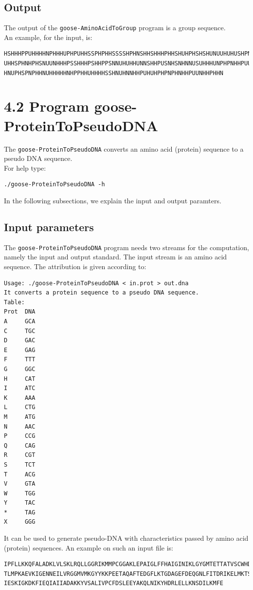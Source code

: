 \documentclass[11pt,journal,compsoc]{report}[1]
\begin{document}
\subsection*{Output}

The output of the \texttt{goose-AminoAcidToGroup} program is a group sequence.\\
An example, for the input, is:
\begin{lstlisting}
HSHHHPPUHHHHNPHHHUPHPUHHSSPHPHHSSSSHPHNSHHSHHHPHHSHUHPHSHSHUNUUHUHUSHPNHUHUSUUHS
UHHSPHNHPHSNUUNHHHPSSHHHPSHHPPSNNUHUHHUNNSHHPUSNHSNHNNUSUHHHUNPHPNHHPUUUSPHHHSUH
HNUPHSPNPHHNUHHHHHNHPPHHUHHHHSSHNUHNNHHPUHUHPHPNPHNHHPUUNHHPHHN
\end{lstlisting}

\section*{4.2 Program goose-ProteinToPseudoDNA}

The \texttt{goose-ProteinToPseudoDNA} converts an amino acid (protein) sequence to a pseudo DNA sequence.\\
For help type:
\begin{lstlisting}
./goose-ProteinToPseudoDNA -h
\end{lstlisting}
In the following subsections, we explain the input and output paramters.

\subsection*{Input parameters}

The \texttt{goose-ProteinToPseudoDNA} program needs two streams for the computation,
namely the input and output standard. The input stream is an amino acid sequence.
The attribution is given according to:
\begin{lstlisting}
Usage: ./goose-ProteinToPseudoDNA < in.prot > out.dna
It converts a protein sequence to a pseudo DNA sequence.
Table:
Prot  DNA
A	  GCA
C	  TGC
D	  GAC
E	  GAG
F	  TTT
G	  GGC
H	  CAT
I	  ATC
K	  AAA
L	  CTG
M	  ATG
N	  AAC
P	  CCG
Q	  CAG
R	  CGT
S     TCT
T	  ACG
V	  GTA
W	  TGG
Y	  TAC
*	  TAG
X	  GGG
\end{lstlisting}
It can be used to generate pseudo-DNA with characteristics passed by amino acid (protein) sequences. An example on such an input file is:
\begin{lstlisting}
IPFLLKKQFALADKLVLSKLRQLLGGRIKMMPCGGAKLEPAIGLFFHAIGINIKLGYGMTETTATVSCWHDFQFNPNSIG
TLMPKAEVKIGENNEILVRGGMVMKGYYKKPEETAQAFTEDGFLKTGDAGEFDEQGNLFITDRIKELMKTSNGKYIAPQY
IESKIGKDKFIEQIAIIADAKKYVSALIVPCFDSLEEYAKQLNIKYHDRLELLKNSDILKMFE
\end{lstlisting}
\end{document}
